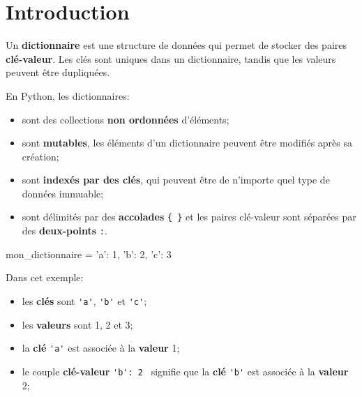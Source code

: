 \def\level{Première}  %
\def\course{NSI}
\def\chaptername{Les dictionnaires} %
\def\docname{AP07}        %

\pagestyle{cours_FP}
\makeheader{} %

\section{Introduction}

\begin{definition}{}
	Un \textbf{dictionnaire} est une structure de données qui permet de stocker des paires \textbf{clé-valeur}. Les clés sont uniques dans un dictionnaire, tandis que les valeurs peuvent être dupliquées.

	En Python, les dictionnaires:
	\begin{itemize}
		\item sont des collections \textbf{non ordonnées} d'éléments;
		\item sont \textbf{mutables}, les éléments d'un dictionnaire peuvent être modifiés après sa création;
		\item sont \textbf{indexés par des clés}, qui peuvent être de n'importe quel type de données immuable;
		\item sont délimités par des \textbf{accolades} \verb|{ }| et les paires clé-valeur sont séparées par des \textbf{deux-points} \verb|:|.
	\end{itemize}
	
	\begin{CodePythontexAlt}[TaillePolice=\normalsize, Largeur=1\linewidth,Centre,PremLigne=1, Lignes=true,]{}
mon_dictionnaire = {'a': 1, 'b': 2, 'c': 3}
	\end{CodePythontexAlt}

	Dans cet exemple:
	\begin{itemize}
		\item les \textbf{clés} sont \verb|'a'|, \verb|'b'| et \verb|'c'|;
		\item les \textbf{valeurs} sont 1, 2 et 3;
		\item la \textbf{clé} \verb|'a'| est associée à la \textbf{valeur} 1;
		\item le couple \textbf{clé-valeur} \verb|'b': 2| \, signifie que la \textbf{clé} \verb|'b'| est associée à la \textbf{valeur} 2;
	\end{itemize}
	
\end{definition}

